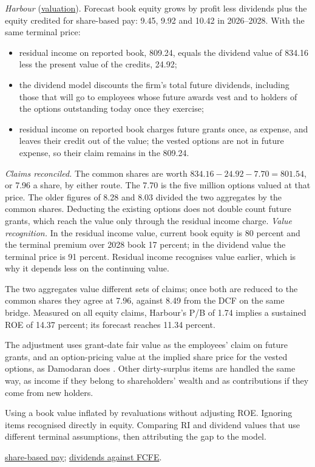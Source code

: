\begin{qfmethod}
 \emph{Harbour} (\hyperref[meth:residual-income-valuation]{valuation}). Forecast book equity grows by profit less dividends plus the equity credited for share-based pay: 9.45, 9.92 and 10.42 in 2026--2028. With the same terminal price:
\begin{itemize}
\item residual income on reported book, 809.24, equals the dividend value of 834.16 less the present value of the credits, 24.92;
\item the dividend model discounts the firm's total future dividends, including those that will go to employees whose future awards vest and to holders of the options outstanding today once they exercise;
\item residual income on reported book charges future grants once, as expense, and leaves their credit out of the value; the vested options are not in future expense, so their claim remains in the 809.24.
\end{itemize}
\emph{Claims reconciled.} The common shares are worth $834.16-24.92-7.70=801.54$, or 7.96 a share, by either route. The 7.70 is the five million options valued at that price. The older figures of 8.28 and 8.03 divided the two aggregates by the common shares. Deducting the existing options does not double count future grants, which reach the value only through the residual income charge.
\emph{Value recognition.} In the residual income value, current book equity is 80 percent and the terminal premium over 2028 book 17 percent; in the dividend value the terminal price is 91 percent. Residual income recognises value earlier, which is why it depends less on the continuing value.

The two aggregates value different sets of claims; once both are reduced to the common shares they agree at 7.96, against 8.49 from the DCF on the same bridge. Measured on all equity claims, Harbour's P/B of 1.74 implies a sustained ROE of 14.37 percent; its forecast reaches 11.34 percent.

 The adjustment uses grant-date fair value as the employees' claim on future grants, and an option-pricing value at the implied share price for the vested options, as Damodaran does \citep[pp.~445--448]{investment-valuation-2012}. Other dirty-surplus items are handled the same way, as income if they belong to shareholders' wealth and as contributions if they come from new holders.

 Using a book value inflated by revaluations without adjusting ROE. Ignoring items recognised directly in equity. Comparing RI and dividend values that use different terminal assumptions, then attributing the gap to the model.

 \hyperref[meth:share-based-compensation-modelling]{share-based pay}; \hyperref[meth:cash-flow-proxies]{dividends against FCFE}.

\end{qfmethod}
